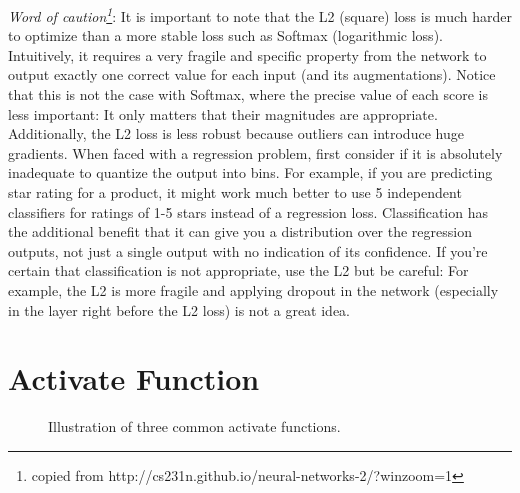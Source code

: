 \documentclass[runningheads,openany]{xhlPaper}
\begin{document}
\emph{Word of caution\footnote{copied from http://cs231n.github.io/neural-networks-2/?winzoom=1}}: It is important to note that the L2 (square) loss is much harder to optimize than a more stable loss such as Softmax (logarithmic loss). Intuitively, it requires a very fragile and specific property from the network to output exactly one correct value for each input (and its augmentations). Notice that this is not the case with Softmax, where the precise value of each score is less important: It only matters that their magnitudes are appropriate. Additionally, the L2 loss is less robust because outliers can introduce huge gradients. When faced with a regression problem, first consider if it is absolutely inadequate to quantize the output into bins. For example, if you are predicting star rating for a product, it might work much better to use 5 independent classifiers for ratings of 1-5 stars instead of a regression loss. Classification has the additional benefit that it can give you a distribution over the regression outputs, not just a single output with no indication of its confidence. If you’re certain that classification is not appropriate, use the L2 but be careful: For example, the L2 is more fragile and applying dropout in the network (especially in the layer right before the L2 loss) is not a great idea.


\section{Activate Function}
\begin{figure}
\centering
{}
\caption{Illustration of three common activate functions.}
\label{fig:mlp_activate_functions}
\end{figure}
\end{document}
